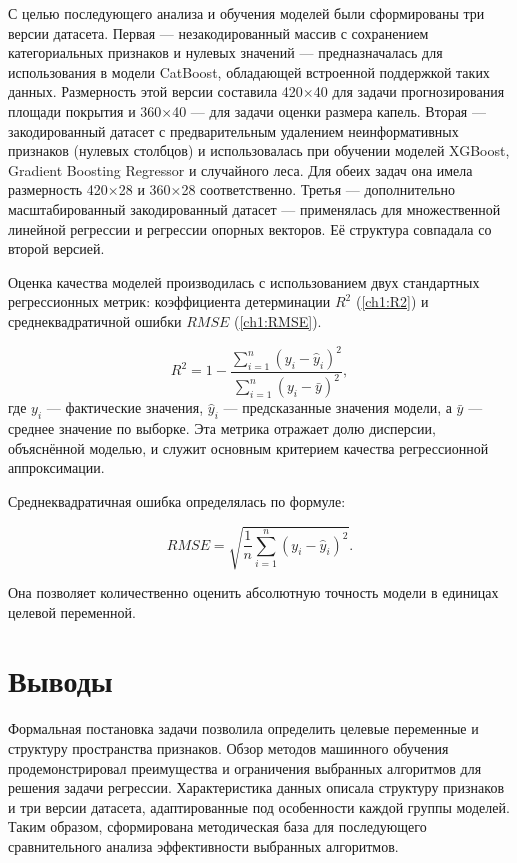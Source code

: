С целью последующего анализа и обучения моделей были сформированы три версии датасета. Первая --- незакодированный массив с сохранением категориальных признаков и нулевых значений --- предназначалась для использования в модели CatBoost, обладающей встроенной поддержкой таких данных. Размерность этой версии составила 420×40 для задачи прогнозирования площади покрытия и 360×40 --- для задачи оценки размера капель. Вторая --- закодированный датасет с предварительным удалением неинформативных признаков (нулевых столбцов) и использовалась при обучении моделей XGBoost, Gradient Boosting Regressor и случайного леса. Для обеих задач она имела размерность 420×28 и 360×28 соответственно. Третья --- дополнительно масштабированный закодированный датасет --- применялась для множественной линейной регрессии и регрессии опорных векторов. Её структура совпадала со второй версией.

Оценка качества моделей производилась с использованием двух стандартных регрессионных метрик: коэффициента детерминации $R^2$ (\ref{ch1:R2}) и среднеквадратичной ошибки $RMSE$ (\ref{ch1:RMSE}).

\begin{equation}\label{ch1:R2}
R^2 = 1 - \frac{\sum_{i=1}^{n} (y_i - \hat{y}_i)^2}{\sum_{i=1}^{n} (y_i - \bar{y})^2},
\end{equation}
где $y_i$ — фактические значения, $\hat{y}_i$ — предсказанные значения модели, а $\bar{y}$ — среднее значение по выборке. Эта метрика отражает долю дисперсии, объяснённой моделью, и служит основным критерием качества регрессионной аппроксимации.

Среднеквадратичная ошибка определялась по формуле:

\begin{equation}\label{ch1:RMSE}
RMSE = \sqrt{\frac{1}{n} \sum_{i=1}^{n} (y_i - \hat{y}_i)^2}.
\end{equation}

Она позволяет количественно оценить абсолютную точность модели в единицах целевой переменной.

\section{Выводы}
Формальная постановка задачи позволила определить целевые переменные и структуру пространства признаков. Обзор методов машинного обучения продемонстрировал преимущества и ограничения выбранных алгоритмов для решения задачи регрессии. Характеристика данных описала структуру признаков и три версии датасета, адаптированные под особенности каждой группы моделей. Таким образом, сформирована методическая база для последующего сравнительного анализа эффективности выбранных алгоритмов.
